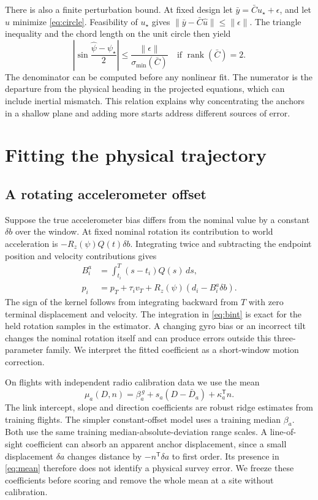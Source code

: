 \documentclass{IEEEtaes}
\newcommand{\rz}{R_z}
\newcommand{\norm}[1]{\left\lVert#1\right\rVert}
\newcommand{\trans}{^{\mathsf T}}
\begin{document}
There is also a finite perturbation bound. At fixed design let \(\bar y=\bar C u_\star+\epsilon\), and let \(\hat u\) minimize \eqref{eq:circle}. Feasibility of \(u_\star\) gives \(\|\bar y-\bar C\hat u\|\le\|\epsilon\|\). The triangle inequality and the chord length on the unit circle then yield
\begin{equation}
 \left|\sin\frac{\hat\psi-\psi_\star}{2}\right|
 \le \frac{\norm{\epsilon}}{\sigma_{\min}(\bar C)}
 \quad\text{if }\operatorname{rank}(\bar C)=2 .
 \label{eq:chord}
\end{equation}
The denominator can be computed before any nonlinear fit. The numerator is the departure from the physical heading in the projected equations, which can include inertial mismatch. This relation explains why concentrating the anchors in a shallow plane and adding more starts address different sources of error.

\section{Fitting the physical trajectory}\label{sec:fit}
\subsection{A rotating accelerometer offset}
Suppose the true accelerometer bias differs from the nominal value by a constant \(\delta b\) over the window. At fixed nominal rotation its contribution to world acceleration is \(-\rz(\psi)Q(t)\delta b\). Integrating twice and subtracting the endpoint position and velocity contributions gives
\begin{align}
 B_i^a &= \int_{t_i}^{T}(s-t_i)Q(s)\,ds,\label{eq:bint}\\
 p_i &=p_T+\tau_i v_T+\rz(\psi)(d_i-B_i^a\delta b).
 \label{eq:bias}
\end{align}
The sign of the kernel follows from integrating backward from \(T\) with zero terminal displacement and velocity. The integration in \eqref{eq:bint} is exact for the held rotation samples in the estimator. A changing gyro bias or an incorrect tilt changes the nominal rotation itself and can produce errors outside this three-parameter family. We interpret the fitted coefficient as a short-window motion correction.

On flights with independent radio calibration data we use the mean
\begin{equation}
 \mu_a(D,n)=\beta_a^{\,g}+s_a(D-\bar D_a)+\kappa_a\trans n .
 \label{eq:mean}
\end{equation}
The link intercept, slope and direction coefficients are robust ridge estimates from training flights. The simpler constant-offset model uses a training median \(\beta_a\). Both use the same training median-absolute-deviation range scales. A line-of-sight coefficient can absorb an apparent anchor displacement, since a small displacement \(\delta a\) changes distance by \(-n\trans\delta a\) to first order. Its presence in \eqref{eq:mean} therefore does not identify a physical survey error. We freeze these coefficients before scoring and remove the whole mean at a site without calibration.
\end{document}
